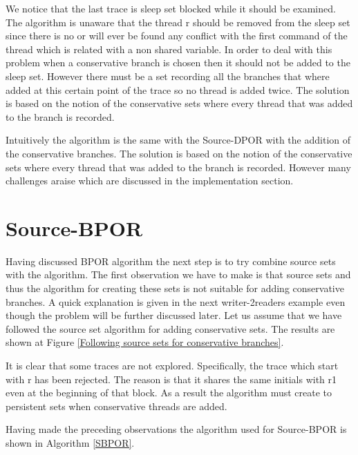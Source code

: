 We notice that the last trace is sleep set blocked while it should be examined. The algorithm is unaware that the thread r should be removed from the sleep set since there is no
or will ever be found any conflict with the first command of the thread which is related with a non shared variable. In order to deal with this problem when a conservative
branch is chosen then it should not be added to the sleep set. However there must be a set recording all the branches that where added at this certain point of the trace
so no thread is added twice. The solution is based on the notion of the conservative sets where every thread that was added to the branch is recorded. 

Intuitively the algorithm is the same with the Source-DPOR with the addition of the conservative branches. The solution is based on the notion of the conservative sets where every thread that was added to the branch is recorded.  However many challenges araise which are discussed 
in the implementation section.


\section{Source-BPOR}

Having discussed BPOR algorithm the next step is to try combine source sets with the algorithm. The first observation we have to make is that
source sets and thus the algorithm for creating these sets is not suitable for adding conservative branches. A quick explanation is given in the next writer-2readers example
even though the problem will be further discussed later. Let us assume that we have followed the source set algorithm for adding conservative sets. 
The results are shown at Figure \ref{Following source sets for conservative branches}.


It is clear that some traces are not explored. Specifically, the trace which start with r has been rejected. The reason is that it shares the same initials with r1 even at the
beginning of that block. As a result the algorithm must create to persistent sets when conservative threads are added. 

Having made the preceding observations the algorithm used for Source-BPOR is shown in Algorithm \ref{SBPOR}.

